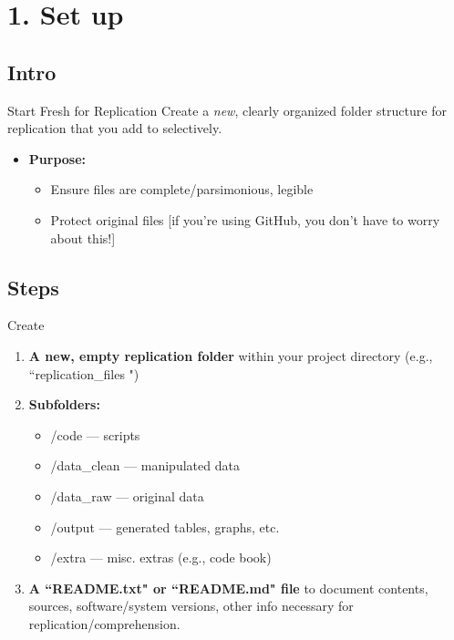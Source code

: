 \documentclass[12pt, compress]{beamer} %
\renewcommand{\texttt}[2][ceruleanblue]{\textcolor{#1}{\ttfamily #2}}%
\let\olditem\item %
\renewcommand{\item}{%
\olditem\vspace{\fill}}
\begin{document}
 \section{1. Set up}
 
 	\subsection{Intro}
 
		 \begin{frame}{Start Fresh for Replication}
		 	Create a \textit{new}, clearly organized folder structure for replication that you add to selectively. 
		 	
		 	\begin{itemize}
		 		\item \textbf{Purpose:} 
		 		\begin{itemize}
		 			\item Ensure files are \textcolor{burntorange}{complete/parsimonious, legible}
		 			\item Protect original files [if you're using GitHub, you don't have to worry about this!]
		 		\end{itemize}
		 	\end{itemize}
		 	
		 \end{frame}
	 
 	\subsection{Steps}
 
		 \begin{frame}{Create}
		 	\begin{enumerate}
		 		\item \textbf{A new, empty replication folder} within your project directory (e.g., ``\texttt{replication\_files}
		 		") 
		 		\item \textbf{Subfolders:}
		 			\begin{itemize}
		 				\item \texttt{/code} --- scripts
		 				\item \texttt{/data\_clean} --- manipulated data
		 				\item \texttt{/data\_raw} --- original data
		 				\item \texttt{/output} --- generated tables, graphs, etc.
		 				\item \texttt{/extra} --- misc. extras (e.g., code book)
		 			\end{itemize}
		 			\item \textbf{A ``README.txt" or ``README.md" file} to document contents, sources, software/system versions, other info necessary for replication/comprehension.
		 	\end{enumerate}
		 \end{frame}
		
\end{document}
